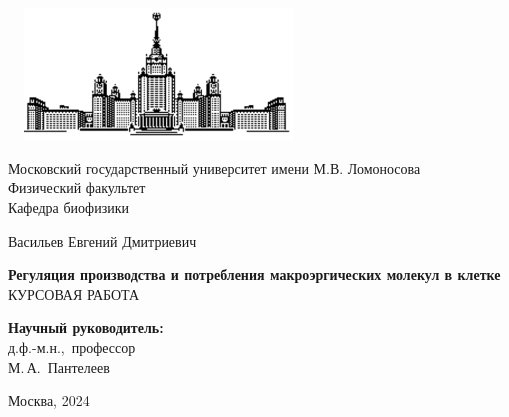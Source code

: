 \begin{titlepage}
\begin{center}
\includegraphics[width=8cm, height=3.5cm]{pic/msu.eps}
\end{center}
\begin{center}
Московский государственный университет имени М.В. Ломоносова\\
\vspace{0.1 cm}
Физический факультет\\
\vspace{0.1 cm}
Кафедра биофизики

\vspace{3cm}
{\Large Васильев Евгений Дмитриевич }\\
\vspace{1cm}

{\bf\LARGE Регуляция производства и потребления макроэргических молекул в клетке}\\ \vspace{2cm}
КУРСОВАЯ РАБОТА

\end{center}
\vspace{2cm}
\begin{flushright}

{\bf Научный руководитель:}\\
д.ф.-м.н.,~профессор\\ 
М.\,А.~Пантелеев

\end{flushright}

\hfill

\centerline {Москва, 2024}

\end{titlepage}




